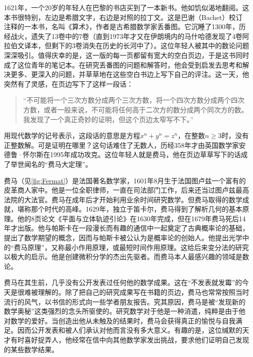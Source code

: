 \documentclass[b5paper]{ctexart}
\begin{document}
\begin{mdframed}

1621年，一个20岁的年轻人在巴黎的书店买到了一本新书。他如饥似渴地翻阅。这本书很特别，左边是希腊文字，右边是对照的拉丁文。这是巴谢（Bachet）校订注释的一本书，名叫《算术》，作者是古希腊数学家丢番图。它沉睡了1300年，历经战火，遗失了13卷中的7卷（直到1973年才又在伊朗境内的马什哈德发现了4卷阿拉伯文译本，但剩下的3卷消失在历史的长河中了）。这位年轻人被其中的数论问题深深吸引。值得庆幸的是，这一版的每一页都留有宽大的空白页边，于是这书同时成了这位青年的笔记本。在研究丢番图的问题和解答时，他会受到启发去思考和解决更多、更深入的问题，并草草地在这些空白书边上写下自己的评注。这一天，他突然有了灵感，在页边写下了这样一段话：

\begin{quotation}
“不可能将一个三次方数分成两个三次方数，将一个四次方数分成两个四次方数，或者一般来说，不可能将任何高于二次方的数分成两个同次方的数。我发现了一个真正奇妙的证明，但这个页边太窄写不下。”
\end{quotation}

用现代数学的记号表示，这段话的意思是方程$x^n + y^n = z^n$，在整数$n \geq 3$时，没有正整数解。可是证明在哪里？这句话难住了无数人，历经358年才由英国数学家安德鲁·怀尔斯在1995年成功攻克。这位年轻人就是费马，他在页边草草写下的话成了举世闻名的“费马大定理”。

费马（见\cref{fig:Fermat}）是法国著名数学家，1601年8月生于法国图卢兹一个富有的皮革商人家中。他是一位全职律师，一直在司法部门工作，后来还当过图卢兹最高法院的大法官。费马在成年后才开始利用业余时间研究数学。但费马取得的数学成就，堪称那个时代的高峰。1629年，独立于笛卡尔，费马得到了解析几何的基本原理。他的8页论文《平面与立体轨迹引论》在1630年完成，但在1679年费马死后14年才出版。他与帕斯卡在一段漫长而有趣的通信中一起奠定了古典概率论的基础，提出了数学期望的概念，因而与帕斯卡被公认为是概率论的创始人。他提出光学中的“费马原理”，又称最小作用原理，或最短时间作用原理。这给后来变分法的研究以极大的启示。他是创建微积分学的杰出先驱者。而费马本人最感兴趣的领域是数论。

费马在其生前，几乎没有公开发表过任何他的数学成果。这在“不发表就发霉”的今天是很难被理解的。除了把自己的研究成果写在书籍的页边，费马也常常按照当时流行的风气，以书信的形式向一些学者朋友报告。究其原因，费马是被“发现新的数学奥秘”这类强烈的念头所驱使的。研究数学对于他是一种消遣，纯粹是由于他对数学的爱好。当创造出他从未触及的结果时，费马会获得真正的愉悦与自我满足。因而公开发表和被人们承认对他而言没有多大意义\cite{HanXueTao2009}。有趣的是，这位缄默的天才有时喜好捉弄人，他经常在信中向其他数学家发出挑战，要求他们证明自己发现的某些数学结果。


\end{mdframed}
\end{document}
